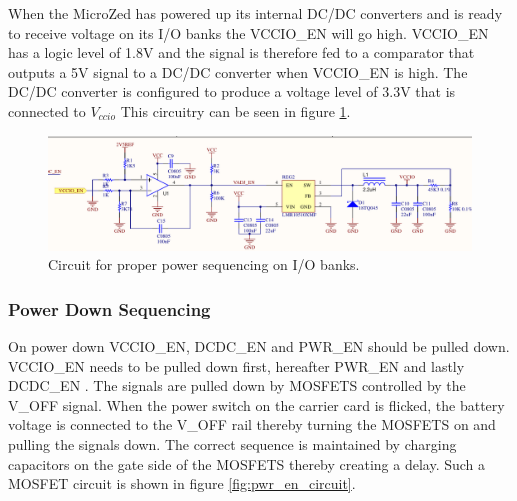 When the MicroZed has powered up its internal DC/DC converters and is ready to receive voltage on its I/O banks the VCCIO\_EN will go high.
VCCIO\_EN has a logic level of 1.8V and the signal is therefore fed to a comparator that outputs a 5V signal to a DC/DC converter when VCCIO\_EN is high.
The DC/DC converter is configured to produce a voltage level of 3.3V that is connected to $V_{ccio}$
This circuitry can be seen in figure \ref{fig:pwr_io_circuit}.

\begin{figure}
	\centering
	\includegraphics[width=1\linewidth]{graphics/vccio_power_up.pdf}
	\caption{Circuit for proper power sequencing on I/O banks.}
	\label{fig:pwr_io_circuit}
\end{figure}

\subsubsection*{Power Down Sequencing}
On power down VCCIO\_EN, DCDC\_EN and PWR\_EN should be pulled down. 
VCCIO\_EN needs to be pulled down first, hereafter PWR\_EN and lastly DCDC\_EN .
The signals are pulled down by MOSFETS controlled by the V\_OFF signal.
When the power switch on the carrier card is flicked, the battery voltage is connected to the V\_OFF rail thereby turning the MOSFETS on and pulling the signals down. 
The correct sequence is maintained by charging capacitors on the gate side of the MOSFETS thereby creating a delay.
Such a MOSFET circuit is shown in figure \ref{fig:pwr_en_circuit}.


